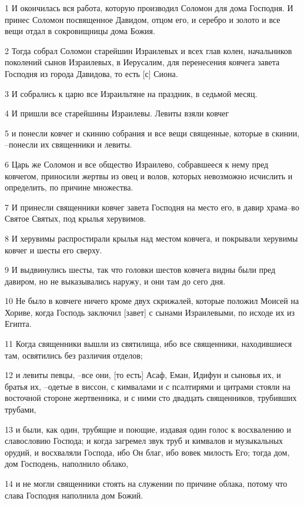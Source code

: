 \par 1 И окончилась вся работа, которую производил Соломон для дома Господня. И принес Соломон посвященное Давидом, отцом его, и серебро и золото и все вещи отдал в сокровищницы дома Божия.
\par 2 Тогда собрал Соломон старейшин Израилевых и всех глав колен, начальников поколений сынов Израилевых, в Иерусалим, для перенесения ковчега завета Господня из города Давидова, то есть [с] Сиона.
\par 3 И собрались к царю все Израильтяне на праздник, в седьмой месяц.
\par 4 И пришли все старейшины Израилевы. Левиты взяли ковчег
\par 5 и понесли ковчег и скинию собрания и все вещи священные, которые в скинии, --понесли их священники и левиты.
\par 6 Царь же Соломон и все общество Израилево, собравшееся к нему пред ковчегом, приносили жертвы из овец и волов, которых невозможно исчислить и определить, по причине множества.
\par 7 И принесли священники ковчег завета Господня на место его, в давир храма--во Святое Святых, под крылья херувимов.
\par 8 И херувимы распростирали крылья над местом ковчега, и покрывали херувимы ковчег и шесты его сверху.
\par 9 И выдвинулись шесты, так что головки шестов ковчега видны были пред давиром, но не выказывались наружу, и они там до сего дня.
\par 10 Не было в ковчеге ничего кроме двух скрижалей, которые положил Моисей на Хориве, когда Господь заключил [завет] с сынами Израилевыми, по исходе их из Египта.
\par 11 Когда священники вышли из святилища, ибо все священники, находившиеся там, освятились без различия отделов;
\par 12 и левиты певцы, --все они, [то есть] Асаф, Еман, Идифун и сыновья их, и братья их, --одетые в виссон, с кимвалами и с псалтирями и цитрами стояли на восточной стороне жертвенника, и с ними сто двадцать священников, трубивших трубами,
\par 13 и были, как один, трубящие и поющие, издавая один голос к восхвалению и славословию Господа; и когда загремел звук труб и кимвалов и музыкальных орудий, и восхваляли Господа, ибо Он благ, ибо вовек милость Его; тогда дом, дом Господень, наполнило облако,
\par 14 и не могли священники стоять на служении по причине облака, потому что слава Господня наполнила дом Божий.

